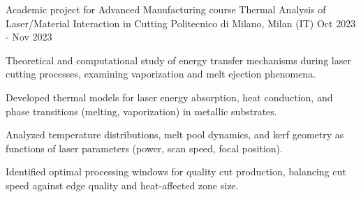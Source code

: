
\cventry
{Academic project for Advanced Manufacturing course}
{Thermal Analysis of Laser/Material Interaction in Cutting}
{Politecnico di Milano, Milan (IT)}
{Oct 2023 - Nov 2023}
{
    Theoretical and computational study of energy transfer mechanisms during laser cutting processes, examining vaporization and melt ejection phenomena.
    \newline
    \vspace{4mm}
    \begin{cvitems}
        \item {Developed thermal models for laser energy absorption, heat conduction, and phase transitions (melting, vaporization) in metallic substrates.}
        \item {Analyzed temperature distributions, melt pool dynamics, and kerf geometry as functions of laser parameters (power, scan speed, focal position).}
        \item {Identified optimal processing windows for quality cut production, balancing cut speed against edge quality and heat-affected zone size.}
    \end{cvitems}
}
